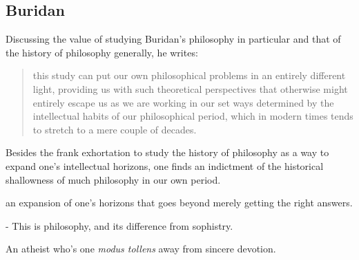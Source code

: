 \documentclass[]{article}
\begin{document}


\subsection{Buridan}
Discussing the value of studying Buridan's philosophy in particular and that of the history of philosophy generally, he writes: 

\begin{quote}
	this study can put our own philosophical problems in an entirely different light, providing us with
	such theoretical perspectives that otherwise might entirely escape us as we are working in our
	set ways determined by the intellectual habits of our philosophical period, which in modern
	times tends to stretch to a mere couple of decades. \autocite[17]{Klima2005}
\end{quote}
Besides the frank exhortation to study the history of philosophy as a way to expand one's intellectual horizons, 
one finds an indictment of the historical shallowness of much philosophy in our own period. 


an expansion of one's horizons that goes beyond merely getting the right answers.

- This is philosophy, and its difference from sophistry.

An atheist who's one \emph{modus tollens} away from sincere devotion.
\end{document}
